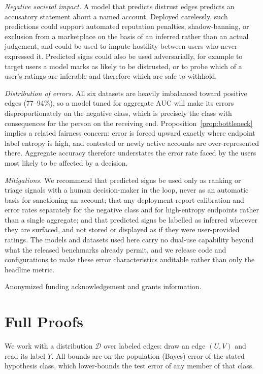 \documentclass[sigconf, review, anonymous]{acmart}
\theoremstyle{plain}
\theoremstyle{definition}
\begin{document}
\emph{Negative societal impact.} A model that predicts distrust edges predicts an accusatory statement about a named account. Deployed carelessly, such predictions could support automated reputation penalties, shadow-banning, or exclusion from a marketplace on the basis of an inferred rather than an actual judgement, and could be used to impute hostility between users who never expressed it. Predicted signs could also be used adversarially, for example to target users a model marks as likely to be distrusted, or to probe which of a user's ratings are inferable and therefore which are safe to withhold.

\emph{Distribution of errors.} All six datasets are heavily imbalanced toward positive edges (77--94\%), so a model tuned for aggregate AUC will make its errors disproportionately on the negative class, which is precisely the class with consequences for the person on the receiving end. Proposition~\ref{prop:bottleneck} implies a related fairness concern: error is forced upward exactly where endpoint label entropy is high, and contested or newly active accounts are over-represented there. Aggregate accuracy therefore understates the error rate faced by the users most likely to be affected by a decision.

\emph{Mitigations.} We recommend that predicted signs be used only as ranking or triage signals with a human decision-maker in the loop, never as an automatic basis for sanctioning an account; that any deployment report calibration and error rates separately for the negative class and for high-entropy endpoints rather than a single aggregate; and that predicted signs be labelled as inferred wherever they are surfaced, and not stored or displayed as if they were user-provided ratings. The models and datasets used here carry no dual-use capability beyond what the released benchmarks already permit, and we release code and configurations to make these error characteristics auditable rather than only the headline metric.

\begin{acks}
Anonymized funding acknowledgement and grants information.
\end{acks}

\appendix
\section{Full Proofs}
\label{app:proofs}
We work with a distribution $\mathcal{D}$ over labeled edges: draw an edge $(U,V)$ and read its label $Y$. All bounds are on the population (Bayes) error of the stated hypothesis class, which lower-bounds the test error of any member of that class.
\end{document}
